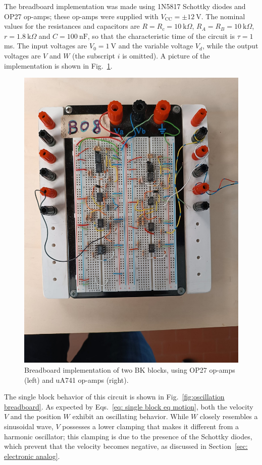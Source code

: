 The breadboard implementation was made using 1N5817 Schottky diodes
and OP27 op-amps; these op-amps were
supplied with $V_{\text{CC}}=\pm12~\text{V}$. The nominal values for the
resistances and capacitors are $R=R_c=10~\text{k}\Omega$,
$R_A=R_B=10~\text{k}\Omega$, $r=1.8~\text{k}\Omega$ and
$C=100~\text{nF}$, so that the characteristic time of the circuit is $\tau=1$ ms.
The input voltages are $V_0=1~\text{V}$ and
the variable voltage $V_d$, while the output voltages are
$V$ and $W$ (the subscript $i$ is omitted).
A picture of the implementation is shown in Fig.~\ref{fig: photo breadboard}.

\begin{figure}[!htbp]
\centering
    \includegraphics[width=.5\linewidth,trim={0 10cm 0 0},clip,center]{images/photo_breadboard.jpeg}
    \caption{Breadboard implementation of two BK blocks, using OP27 op-amps (left) and uA741 op-amps
    (right).
    }\label{fig: photo breadboard}
\end{figure}

The single block behavior of this circuit is shown in Fig.~\ref{fig:oscillation breadboard}.
As expected by Eqs.~\ref{eq: single block eq motion}, both the velocity $V$ and the position $W$
exhibit an oscillating behavior. While $W$ closely resembles a sinusoidal wave, $V$ possesses
a lower clamping that makes it different from a harmonic oscillator; this clamping is due
to the presence of the Schottky diodes, which prevent that the velocity becomes negative, as
discussed in Section~\ref{sec: electronic analog}.

